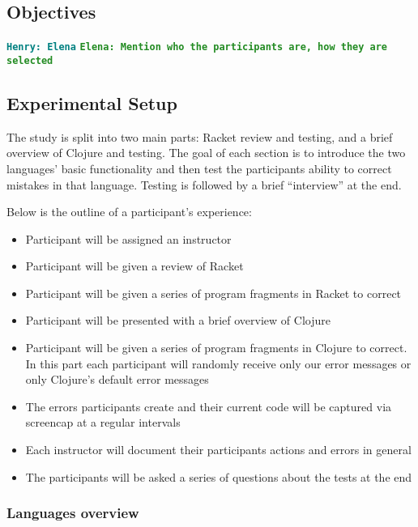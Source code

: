\documentclass[12pt]{article}
\newcommand{\comment}[1]{{\bf \tt  {#1}}}
\newcommand{\emcomment}[1]{\textcolor{ForestGreen}{\comment{Elena: {#1}}}}
\newcommand{\hfcomment}[1]{\textcolor{Teal}{\comment{Henry: {#1}}}}
\newcommand{\thcomment}[1]{\textcolor{Coquelicot}{\comment{Thomas: {#1}}}}
\begin{document}
	\subsection{Objectives}\label{sec:obj}
	\hfcomment{Elena}
	\emcomment{Mention who the participants are, how they are selected}

	\subsection{Experimental Setup}\label{sec:setup}
	
	   
The study is split into two main parts: Racket review and testing, and a brief overview of Clojure and testing.
The goal of each section is to introduce the two languages' basic functionality and then test the participants ability to correct mistakes in that language.
 Testing is followed by a brief ``interview'' at the end. 

Below is the outline of a participant's experience:
\begin{itemize}
\item Participant will be assigned an instructor
\item Participant will be given a review of Racket
\item Participant will be given a series of program fragments in Racket to correct
\item Participant will be presented with a brief overview of Clojure
\item Participant will be given a series of  program fragments in Clojure to correct. In this part each participant will randomly receive only our error messages or only Clojure's default error messages
\item The errors participants create and their current code will be captured via screencap at a regular intervals
\item Each instructor will document their participants actions and errors in general
\item The participants will be asked a series of questions about the tests at the end
\end{itemize}

\subsubsection{Languages overview}\label{subsec:overview}
\end{document}
